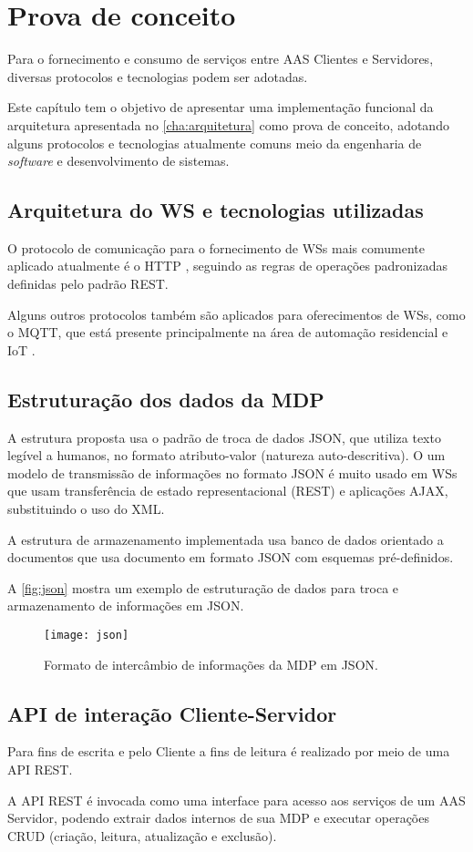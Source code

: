 \chapter{Prova de conceito}

	Para o fornecimento e consumo de serviços entre AAS Clientes e Servidores, diversas protocolos e tecnologias podem ser adotadas.
	
	Este capítulo tem o objetivo de apresentar uma implementação funcional da arquitetura apresentada no \autoref{cha:arquitetura} como prova de conceito, adotando alguns protocolos e tecnologias atualmente comuns meio da engenharia de \textit{software} e desenvolvimento de sistemas.
	

\section{ Arquitetura do WS e tecnologias utilizadas }

	O protocolo de comunicação para o fornecimento de WSs mais comumente aplicado atualmente é o HTTP \cite{gruner2016restful}, seguindo as regras de operações padronizadas definidas pelo padrão REST.
	
	Alguns outros protocolos também são aplicados para oferecimentos de WSs, como o MQTT, que está presente principalmente na área de automação residencial e IoT \cite{yokotani2016mqtt}.


\section{ Estruturação dos dados da MDP }

	A estrutura proposta usa o padrão de troca de dados JSON, que utiliza texto legível a humanos, no formato atributo-valor (natureza auto-descritiva). O um modelo de transmissão de informações no formato JSON é muito usado em WSs que usam transferência de estado representacional (REST) e aplicações AJAX, substituindo o uso do XML.
	
	A estrutura de armazenamento implementada usa banco de dados orientado a documentos que usa documento em formato JSON com esquemas pré-definidos.
	
	A \autoref{fig:json} mostra um exemplo de estruturação de dados para troca e armazenamento de informações em JSON.
	
	\begin{figure}[htb]
		\centering
		\caption{Formato de intercâmbio de informações da MDP em JSON.}
		\label{fig:json}
		\texttt{[image: json]}
	\end{figure}

	
\section{ API de interação Cliente-Servidor }

	Para fins de escrita e pelo Cliente a fins de leitura é realizado por meio de uma API REST.
	
	A API REST é invocada como uma interface para acesso aos serviços de um AAS Servidor, podendo extrair dados internos de sua MDP e executar operações CRUD (criação, leitura, atualização e exclusão).
	